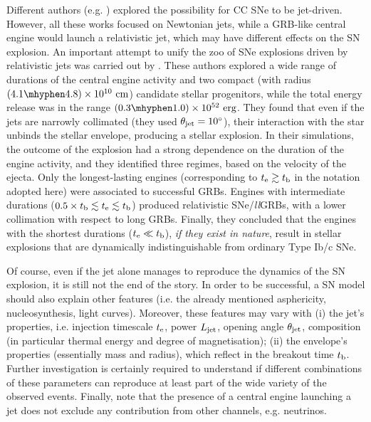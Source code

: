 \documentclass[useAMS,usenatbib]{mn2e}
\begin{document}
Different authors (e.g. \citealt{Khokhlov1999, MaedaNomoto2003, Couch2009}) explored the possibility for CC SNe to be jet-driven. However, all these works focused on Newtonian jets, while a GRB-like central engine would launch a relativistic jet, which may have different effects on the SN explosion. An important attempt to unify the zoo of SNe explosions driven by relativistic jets was carried out by \citet{Lazzati2012}. These authors explored a wide range of durations of the central engine activity and two compact (with radius $(4.1\mhyphen4.8)\times 10^{10}\text{ cm}$) candidate stellar progenitors, while the total energy release was in the range $(0.3\mhyphen1.0)\times 10^{52}\text{ erg}$. They found that even if the jets are narrowly collimated (they used $\theta_{\rm jet}=10^\circ$), their interaction with the star unbinds the stellar envelope, producing a stellar explosion.
In their simulations, the outcome of the explosion had a strong dependence on the duration of the engine activity, and they identified three regimes, based on the velocity of the ejecta. Only the longest-lasting engines (corresponding to $t_{\rm e}\gtrsim t_{\rm b}$ in the notation adopted here) were associated to successful GRBs. Engines with intermediate durations ($0.5\times t_{\rm b}\lesssim t_{\rm e}\lesssim t_{\rm b}$) produced relativistic SNe/{\it ll}GRBs, with a lower collimation with respect to long GRBs. Finally, they concluded that the engines with the shortest durations ($t_{\rm e}\ll t_{\rm b}$), {\it if they exist in nature}, result in stellar explosions that are dynamically indistinguishable from ordinary Type Ib/c SNe.

Of course, even if the jet alone manages to reproduce the dynamics of the SN explosion, it is still not the end of the story. In order to be successful, a SN model should also explain other features (i.e. the already mentioned asphericity, nucleosynthesis, light curves). Moreover, these features may vary with (i) the jet's properties, i.e. injection timescale $t_{\rm e}$, power $L_{\rm jet}$, opening angle $\theta_{\rm jet}$, composition (in particular thermal energy and degree of magnetisation); (ii) the envelope's properties (essentially mass and radius), which reflect in the breakout time $t_{\rm b}$. Further investigation is certainly required to understand if different combinations of these parameters can reproduce at least part of the wide variety of the observed events. Finally, note that the presence of a central engine launching a jet does not exclude any contribution from other channels, e.g. neutrinos.
\end{document}

